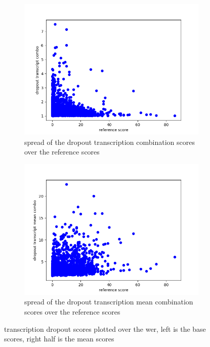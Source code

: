 \begin{figure}
        \centering%
    \begin{subfigure}{0.4\linewidth}
        \includegraphics[width=\textwidth]{Latex/sections/images/seamlessdropouttranscriptcombo.png}
        \caption{spread of the dropout transcription combination scores over the reference scores}
    \end{subfigure}
    \begin{subfigure}{0.4\linewidth}
        \includegraphics[width=\textwidth]{Latex/sections/images/seamlessdropouttranscriptmeancombo.png}
        \caption{spread of the dropout transcription mean combination scores over the reference scores}
    \end{subfigure}
    \caption{transcription dropout scores plotted over the wer, left is the base scores, right half is the mean scores}
    \label{fig:dropout transcript combo scores}
\end{figure}

